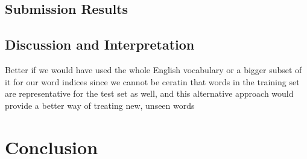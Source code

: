 \documentclass[11pt,a4paper]{article}
\begin{document}
\subsection{Submission Results}

\subsection{Discussion and Interpretation}

Better if we would have used the whole English vocabulary or a bigger subset of it for our word indices since we cannot be ceratin that words in the training set are representative for the test set as well, and this alternative approach would provide a better way of treating new, unseen words

\section{Conclusion}



\end{document}
